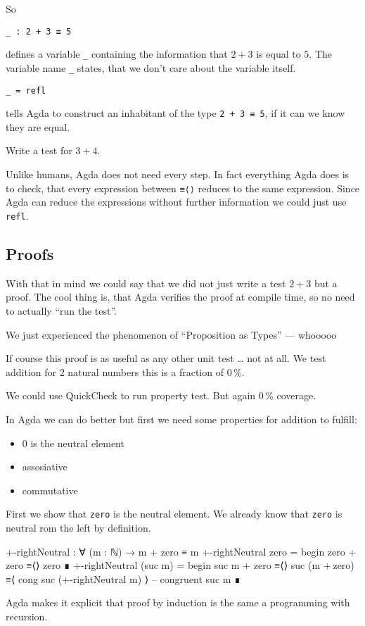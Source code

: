 So
\begin{verbatim}
_ : 2 + 3 ≡ 5
\end{verbatim}
defines a variable \verb+_+ containing the information that $2+3$ is equal to $5$.
The variable name \verb+_+ states, that we don't care about the variable itself.

\begin{verbatim}
_ = refl
\end{verbatim}
tells Agda to construct an inhabitant of the type \verb=2 + 3 ≡ 5=, if it can
we know they are equal.

\begin{exercise}
Write a test for $3+4$.
\end{exercise}

Unlike humans, Agda does not need every step. In fact everything Agda
does is to check, that every expression between \verb+≡⟨⟩+ reduces to the
same expression. Since Agda can reduce the expressions without further
information we could just use \verb+refl+.

\subsection{Proofs}
With that in mind we could say that we did not just write a test $2+3$ but a proof.
The cool thing is, that Agda verifies the proof at compile time, so no need to
actually “run the test”.

We just experienced the phenomenon of “Proposition as Types” — whooooo

If course this proof is as useful as any other unit test … not at all.
We test addition for 2 natural numbers this is a fraction of 0\,\%.

We could use QuickCheck to run property test. But again 0\,\% coverage.

In Agda we can do better but first we need some properties for addition to fulfill:
\begin{itemize}
  \item $0$ is the neutral element
  \item assosiative
  \item commutative
\end{itemize}

First we show that \verb+zero+ is the neutral element. We already
know that \verb+zero+ is neutral rom the left by definition.
\begin{code}
+-rightNeutral : ∀ (m : ℕ) → m + zero ≡ m
+-rightNeutral zero =
  begin
    zero + zero
  ≡⟨⟩
    zero
  ∎
+-rightNeutral (suc m) =
  begin
    suc m + zero
  ≡⟨⟩
    suc (m + zero)
  ≡⟨ cong  suc (+-rightNeutral m) ⟩ -- congruent
    suc m
  ∎
\end{code}
Agda makes it explicit that proof by induction is the same a programming
with recursion.

